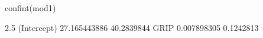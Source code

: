 \begin{Schunk}
\begin{Sinput}
 confint(mod1)
\end{Sinput}
\begin{Soutput}
                   2.5 %     97.5 %
(Intercept) 27.165443886 40.2839844
GRIP         0.007898305  0.1242813
\end{Soutput}
\end{Schunk}

